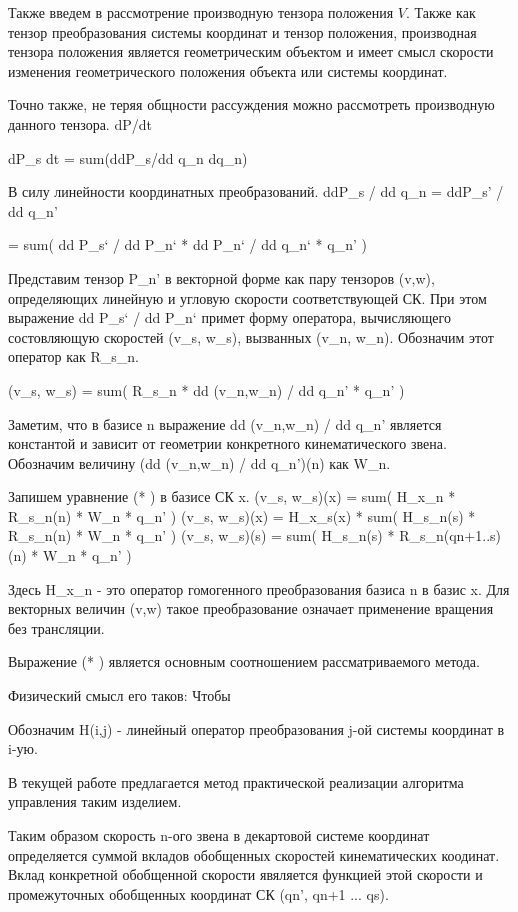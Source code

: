 \documentclass{article}
\begin{document}
Также введем в рассмотрение производную тензора положения $V$. Также как тензор преобразования системы координат и тензор положения, производная тензора положения является геометрическим объектом и имеет смысл скорости изменения геометрического положения объекта или системы координат.




Точно также, не теряя общности рассуждения можно рассмотреть производную данного тензора. dP/dt








dP\_s
dt   = sum(ddP\_s/dd q\_n dq\_n) 

В силу линейности координатных преобразований. 
ddP\_s / dd q\_n = ddP\_s' / dd q\_n'

 = sum( dd P\_s` / dd P\_n` * dd P\_n` / dd q\_n` * q\_n' )

 Представим тензор P\_n' в векторной форме как пару тензоров (v,w), определяющих линейную и угловую скорости соответствующей СК. При этом выражение 
 dd P\_s` / dd P\_n` примет форму оператора, вычисляющего состовляющую скоростей (v\_s, w\_s), вызванных (v\_n, w\_n). Обозначим этот оператор как R\_s\_n.

(v\_s, w\_s) = sum(  R\_s\_n * dd (v\_n,w\_n) / dd q\_n' * q\_n' )

Заметим, что в базисе n выражение dd (v\_n,w\_n) / dd q\_n' является константой и зависит от геометрии конкретного кинематического звена. Обозначим величину (dd (v\_n,w\_n) / dd q\_n')(n) как W\_n.

Запишем уравнение (* ) в базисе СК x.
(v\_s, w\_s)(x) = sum( H\_x\_n * R\_s\_n(n) * W\_n * q\_n' )
(v\_s, w\_s)(x) = H\_x\_s(x) * sum( H\_s\_n(s) * R\_s\_n(n) * W\_n * q\_n' )
(v\_s, w\_s)(s) = sum( H\_s\_n(s) * R\_s\_n(qn+1..s)(n) * W\_n * q\_n' )


Здесь H\_x\_n - это оператор гомогенного преобразования базиса n в базис x. Для векторных величин (v,w) такое преобразование означает применение вращения без трансляции.

Выражение (* ) является основным соотношением рассматриваемого метода.

Физический смысл его таков: Чтобы 

Обозначим H(i,j) - линейный оператор преобразования j-ой системы координат в i-ую. 

В текущей работе предлагается метод практической реализации алгоритма управления таким изделием.

Таким образом скорость n-ого звена в декартовой системе координат определяется суммой вкладов обобщенных скоростей кинематических коодинат. Вклад конкретной обобщенной скорости явяляется функцией этой скорости и промежуточных обобщенных координат СК (qn', qn+1 ... qs).
\end{document}
